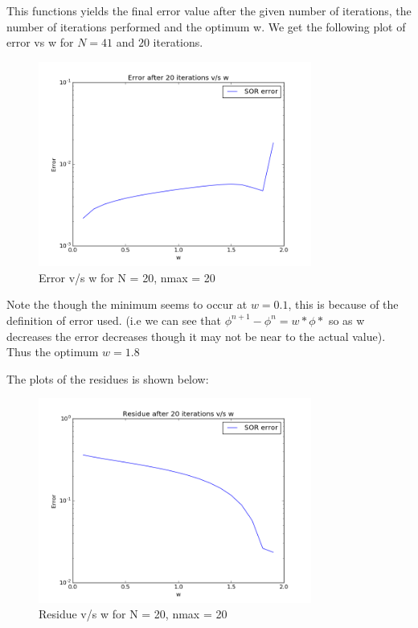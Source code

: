 \documentclass[11pt, a4paper]{article}
\begin{document}
This functions yields the final error value after the given number of iterations, the number of iterations performed and the
optimum w. We get the following plot of error vs w for $N=41$ and $20$ iterations.


\begin{figure}[H]
 \centering
 \includegraphics[width=0.8\textwidth]{nmax_20.png}
 \caption{Error v/s w for N = 20, nmax = 20}
\end{figure}

Note the though the minimum seems to occur at $w=0.1$, this is because of the definition of error used. (i.e we can see that
$\phi^{n+1} - \phi^{n} = w*\phi *$ so as w decreases the error decreases though it may not be near to the actual value). Thus
the optimum $w = 1.8$

The plots of the residues is shown below:
\begin{figure}[H]
 \centering
 \includegraphics[width=0.8\textwidth]{nmax_20_1.png}
 \caption{Residue v/s w for N = 20, nmax = 20}
\end{figure}
\end{document}
